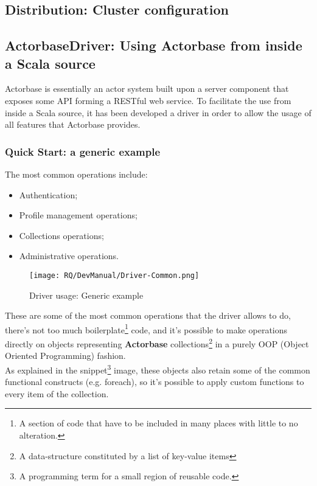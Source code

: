 \documentclass{scalatekids-article}
\begin{document}
\subsection{Distribution: Cluster configuration}

\subsection{ActorbaseDriver: Using Actorbase from inside a Scala source}

Actorbase is essentially an actor system built upon a server component that
exposes some API forming a RESTful web service. To facilitate the use from
inside a Scala source, it has been developed a driver in order to allow the
usage of all features that Actorbase provides.\\

\subsubsection{Quick Start: a generic example}

The most common operations include:
\begin{itemize}
\item Authentication;
\item Profile management operations;
\item Collections operations;
\item Administrative operations.
\end{itemize}

\begin{figure}[H]
  \begin{center}
    \texttt{[image: RQ/DevManual/Driver-Common.png]}
    \caption{Driver usage: Generic example}
  \end{center}
\end{figure}

These are some of the most common operations that the driver allows to do,
there's not too much boilerplate\footnote{A section of code that have to be
  included in many places with little to no alteration.} code, and it's possible
to make operations directly on objects representing \textbf{Actorbase}
collections\footnote{A data-structure constituted by a list of key-value items\label{coll}}
in a purely OOP (Object Oriented Programming) fashion.\\ As explained in
the snippet\footnote{A programming term for a small region of reusable code.}
image, these objects also retain some of the common functional constructs (e.g.
foreach), so it's possible to apply custom functions to every item of the
collection.
\end{document}

